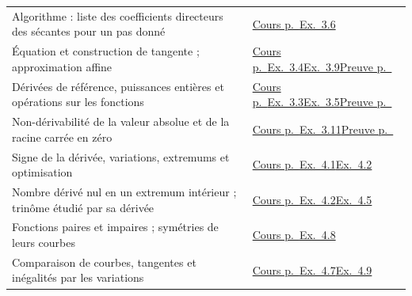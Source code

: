 \begin{longtable}{@{}p{101mm}p{58mm}@{}}
Algorithme : liste des coefficients directeurs des sécantes pour un pas donné & \hyperref[ess-3]{Cours p.~\pageref*{ess-3}}\newline \hyperref[exo-3-6]{Ex.~3.6}\\[2.3mm]
Équation et construction de tangente ; approximation affine & \hyperref[ess-3]{Cours p.~\pageref*{ess-3}}\newline \hyperref[exo-3-4]{Ex.~3.4}\newline \hyperref[exo-3-9]{Ex.~3.9}\newline \hyperref[dem-derivation]{Preuve p.~\pageref*{dem-derivation}}\\[2.3mm]
Dérivées de référence, puissances entières et opérations sur les fonctions & \hyperref[ess-3]{Cours p.~\pageref*{ess-3}}\newline \hyperref[exo-3-3]{Ex.~3.3}\newline \hyperref[exo-3-5]{Ex.~3.5}\newline \hyperref[dem-derivation]{Preuve p.~\pageref*{dem-derivation}}\\[2.3mm]
Non-dérivabilité de la valeur absolue et de la racine carrée en zéro & \hyperref[ess-3]{Cours p.~\pageref*{ess-3}}\newline \hyperref[exo-3-11]{Ex.~3.11}\newline \hyperref[dem-derivation]{Preuve p.~\pageref*{dem-derivation}}\\[2.3mm]
Signe de la dérivée, variations, extremums et optimisation & \hyperref[ess-4]{Cours p.~\pageref*{ess-4}}\newline \hyperref[exo-4-1]{Ex.~4.1}\newline \hyperref[exo-4-2]{Ex.~4.2}\\[2.3mm]
Nombre dérivé nul en un extremum intérieur ; trinôme étudié par sa dérivée & \hyperref[ess-4]{Cours p.~\pageref*{ess-4}}\newline \hyperref[exo-4-2]{Ex.~4.2}\newline \hyperref[exo-4-5]{Ex.~4.5}\\[2.3mm]
Fonctions paires et impaires ; symétries de leurs courbes & \hyperref[ess-4]{Cours p.~\pageref*{ess-4}}\newline \hyperref[exo-4-8]{Ex.~4.8}\\[2.3mm]
Comparaison de courbes, tangentes et inégalités par les variations & \hyperref[ess-4]{Cours p.~\pageref*{ess-4}}\newline \hyperref[exo-4-7]{Ex.~4.7}\newline \hyperref[exo-4-9]{Ex.~4.9}\\[2.3mm]

\end{longtable}
